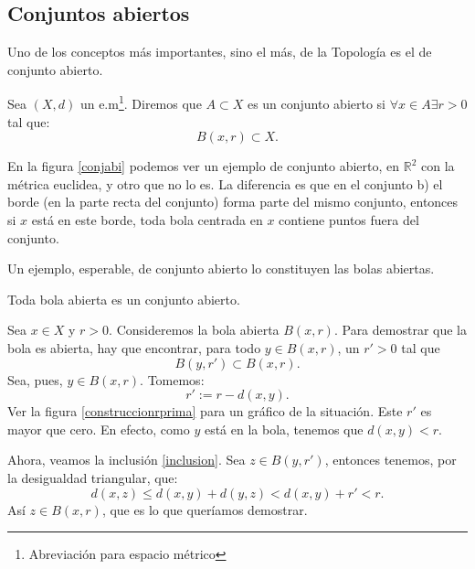 \subsection{Conjuntos abiertos} Uno de los conceptos
más importantes, sino el más, de la Topología es el de
conjunto abierto.
\begin{definicion}{} Sea $(X,d)$ un e.m\footnote{Abreviación para espacio
métrico}. Diremos que $A\subset X$ es un conjunto abierto si
$\forall x\in A\exists r>0$ tal que:
\[
	B(x,r)\subset X.
\]
\end{definicion}
En la figura \vref{conjabi} podemos ver un ejemplo de conjunto
abierto, en $\mathbb{R}^2$ con la métrica euclidea, y otro que
no lo es. La diferencia es que en el conjunto b) el borde (en la
parte recta del conjunto) forma parte del mismo conjunto, entonces
si $x$ está en este borde, toda bola centrada en $x$ contiene
puntos fuera del conjunto.


Un ejemplo, esperable, de conjunto abierto lo constituyen las
bolas abiertas.
\begin{proposicion}{} Toda bola abierta es un conjunto abierto.
\end{proposicion}
\begin{demo} 
Sea $x\in X$ y $r>0$. Consideremos la bola abierta
$B(x,r)$. Para demostrar que la bola es abierta, hay que
encontrar, para todo $y\in B(x,r)$, un $r'>0$ tal que
\begin{equation}\label{inclusion}
	B(y,r')\subset B(x,r).
\end{equation}
Sea, pues, $y\in B(x,r)$. Tomemos:
\[r':=r-d(x,y).\]
Ver la figura \vref{construccionrprima} para un gráfico de la
situación. Este $r'$ es mayor que cero. En efecto, como $y$
está en la bola, tenemos que $d(x,y)<r$.




Ahora, veamos la inclusión \vref{inclusion}. Sea $z\in B(y,r')$,
entonces tenemos, por la desigualdad triangular, que:
\[d(x,z)\leq d(x,y)+d(y,z)< d(x,y)+r'<r.\]
Así $z\in B(x,r)$, que es lo que queríamos demostrar.
\end{demo}

